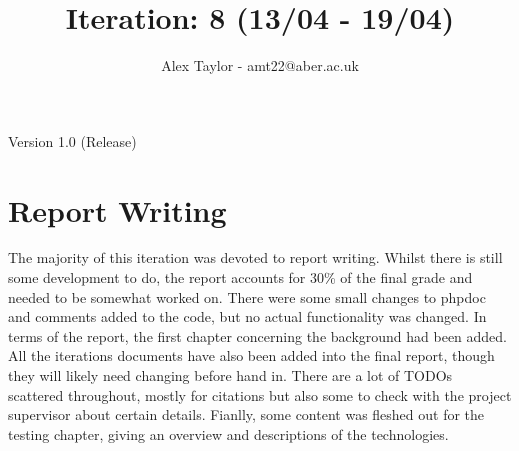 \documentclass{article}
\title{Iteration: 8 (13/04 - 19/04)}
\author{Alex Taylor - amt22@aber.ac.uk}
\begin{document}
\maketitle
\begin{center}
	Version 1.0 (Release)
\end{center}
\tableofcontents
\thispagestyle{empty}
\newpage

\section{Report Writing}
The majority of this iteration was devoted to report writing. Whilst there is still some development to do, the report accounts for 30\% of the final grade and needed to be somewhat worked on. There were some small changes to phpdoc and comments added to the code, but no actual functionality was changed. In terms of the report, the first chapter concerning the background had been added. All the iterations documents have also been added into the final report, though they will likely need changing before hand in. There are a lot of TODOs scattered throughout, mostly for citations but also some to check with the project supervisor about certain details. Fianlly, some content was fleshed out for the testing chapter, giving an overview and descriptions of the technologies.
\newpage

%
%
\end{document}
